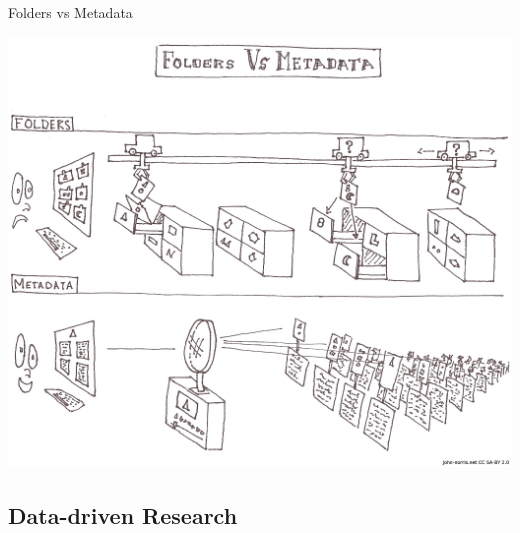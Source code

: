 \documentclass[compress,11pt,xcolor=svgnames,aspectratio=169]{beamer}
\begin{document}
\begin{frame}[fragile] {Folders vs Metadata}

\begin{center}
\includegraphics[scale=0.6]{fig/FoldersVsMeta}
\end{center}

\end{frame}

\subsection{Data-driven Research}
\end{document}
